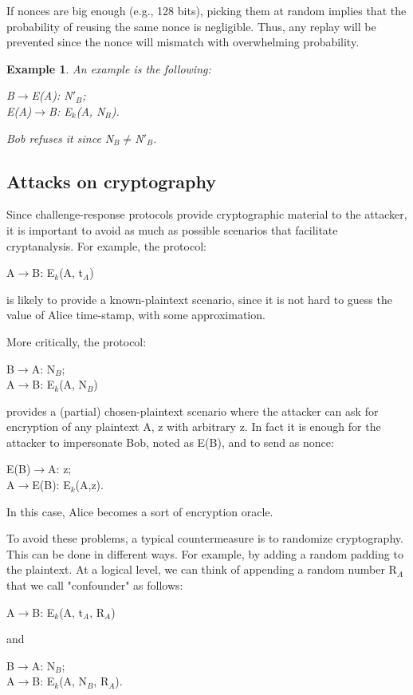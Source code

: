\documentclass[a4paper, 12pt]{report}
\newtheorem{example}{\textbf{Example}}
\begin{document}
If nonces are big enough (e.g., 128 bits), picking them at random implies that the probability of reusing the same nonce is negligible. Thus, any replay will be prevented since the nonce will mismatch with overwhelming probability.
\begin{example}
	An example is the following:
	\begin{center}
		B$\rightarrow$E(A): N$'_B$;\\
		E(A)$\rightarrow$B: E$_k$(A, N$_B$).
	\end{center}
	Bob refuses it since N$_B$$\ne$N$'_B$.
\end{example}

\subsection*{Attacks on cryptography}
Since challenge-response protocols provide cryptographic material to the attacker, it is important to avoid as much as possible scenarios that facilitate cryptanalysis. For example, the protocol:
\begin{center}
	A$\rightarrow$B: E$_k$(A, t$_A$)
\end{center}
is likely to provide a known-plaintext scenario, since it is not hard to guess the value of Alice time-stamp, with some approximation.

More critically, the protocol:
\begin{center}
	B$\rightarrow$A: N$_B$;\\
	A$\rightarrow$B: E$_k$(A, N$_B$)
\end{center}
provides a (partial) chosen-plaintext scenario where the attacker can ask for encryption of any plaintext A, z with arbitrary z. In fact it is enough for the attacker to impersonate Bob, noted as E(B), and to send as nonce:
\begin{center}
	E(B)$\rightarrow$A: z;\\
	A$\rightarrow$E(B): E$_k$(A,z).
\end{center}
In this case, Alice becomes a sort of encryption oracle.

To avoid these problems, a typical countermeasure is to randomize cryptography. This can be done in different ways. For example, by adding a random padding to the plaintext. At a logical level, we can think of appending a random number R$_A$ that we call "confounder" as follows:
\begin{center}
	A$\rightarrow$B: E$_k$(A, t$_A$, R$_A$)
\end{center}
and
\begin{center}
	B$\rightarrow$A: N$_B$;\\
	A$\rightarrow$B: E$_k$(A, N$_B$, R$_A$).
\end{center}
\end{document}
